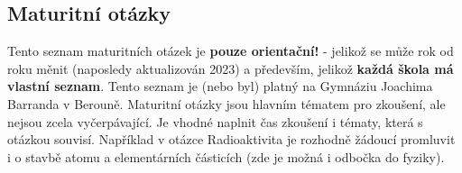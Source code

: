 \newenvironment{boldEnum}
  {\begin{enumerate}
   \let\olditem\item
   \long\def\item##1\\{\olditem{\bfseries ##1}\par}}
  {\end{enumerate}
}

\subsection{Maturitní otázky}
Tento seznam maturitních otázek je \textbf{pouze orientační!} - jelikož se může rok od roku měnit (naposledy aktualizován 2023) a především,
jelikož \textbf{každá škola má vlastní seznam}. Tento seznam je (nebo byl) platný na Gymnáziu Joachima Barranda v Berouně.
Maturitní otázky jsou hlavním tématem pro zkoušení, ale nejsou zcela vyčerpávající. Je vhodné naplnit čas zkoušení i tématy, která s otázkou souvisí.
Například v otázce Radioaktivita je rozhodně žádoucí promluvit i o stavbě atomu a elementárních částicích (zde je možná i odbočka do fyziky). 

